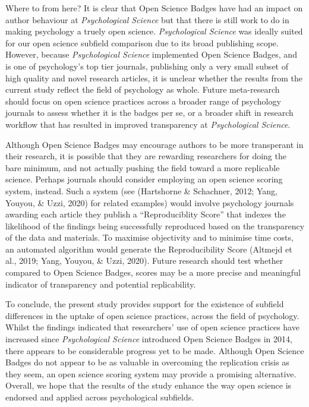 \documentclass[
  english,
  man,floatsintext]{apa6}
\begin{document}
Where to from here? It is clear that Open Science Badges have had an impact on author behaviour at \emph{Psychological Science} but that there is still work to do in making psychology a truely open science. \emph{Psychological Science} was ideally suited for our open science subfield comparison due to its broad publishing scope. However, because \emph{Psychological Science} implemented Open Science Badges, and is one of psychology's top tier journals, publishing only a very small subset of high quality and novel research articles, it is unclear whether the results from the current study reflect the field of psychology as whole. Future meta-research should focus on open science practices across a broader range of psychology journals to assess whether it is the badges per se, or a broader shift in research workflow that has resulted in improved transparency at \emph{Psychological Science}.

Although Open Science Badges may encourage authors to be more transperant in their research, it is possible that they are rewarding researchers for doing the bare minimum, and not actually pushing the field toward a more replicable science. Perhaps journals should consider employing an open science scoring system, instead. Such a system (see (Hartshorne \& Schachner, 2012; Yang, Youyou, \& Uzzi, 2020) for related examples) would involve psychology journals awarding each article they publish a ``Reproduciblity Score'' that indexes the likelihood of the findings being successfully reproduced based on the transparency of the data and materials. To maximise objectivity and to minimise time costs, an automated algorithm would generate the Reproducibility Score (Altmejd et al., 2019; Yang, Youyou, \& Uzzi, 2020). Future research should test whether compared to Open Science Badges, scores may be a more precise and meaningful indicator of transparency and potential replicability.

To conclude, the present study provides support for the existence of subfield differences in the uptake of open science practices, across the field of psychology. Whilst the findings indicated that researchers' use of open science practices have increased since \emph{Psychological Science} introduced Open Science Badges in 2014, there appears to be considerable progress yet to be made. Although Open Science Badges do not appear to be as valuable in overcoming the replication crisis as they seem, an open science scoring system may provide a promising alternative. Overall, we hope that the results of the study enhance the way open science is endorsed and applied across psychological subfields.
\end{document}
